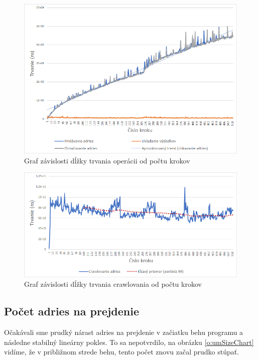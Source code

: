\begin{figure}[!ht]
    \centering
    \includegraphics[width=1\textwidth]{figures/operationsTime.png}
    \caption{Graf závislosti dĺžky trvania operácii od počtu krokov\label{o:opTimes}}
\end{figure}

\begin{figure}[!ht]
    \centering
    \includegraphics[width=1\textwidth]{figures/crawlTimeChart.png}
    \caption{Graf závislosti dĺžky trvania crawlovania od počtu krokov\label{o:crawlTimeChart}}
\end{figure}



\subsection{Počet adries na prejdenie} \label{c:addInteresting}
Očakávali sme prudký nárast adries na prejdenie v začiatku behu programu a následne stabilný lineárny pokles. To sa nepotvrdilo, na obrázku \ref{o:umSizeChart} vidíme, že v približnom strede behu, tento počet znovu začal prudko stúpať. 

